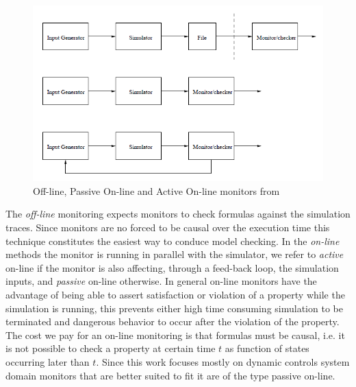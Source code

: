 \begin{figure}[!h]
	\centering 
     \includegraphics[width=.8\textwidth]{Figs/monitortypes.png} 
     \caption{Off-line, Passive On-line and Active On-line monitors from \citep{maler2008checking}} 
     \label{fig:monitortypes} 
\end{figure} 
The \textit{off-line} monitoring expects monitors to check formulas against the simulation traces. Since monitors are no forced to be causal over the execution time this technique constitutes the easiest way to conduce model checking. In the \textit{on-line} methods the monitor is running in parallel with the simulator, we refer to \textit{active} on-line if the monitor is also affecting, through a feed-back loop, the simulation inputs, and \textit{passive} on-line otherwise. In general on-line monitors have the advantage of being able to assert satisfaction or violation of a property while the simulation is running, this prevents either high time consuming simulation to be terminated and dangerous behavior to occur after the violation of the property. The cost we pay for an on-line monitoring is that formulas must be causal, i.e. it is not possible to check a property at certain time $t$ as function of states occurring later than $t$. Since this work focuses mostly on dynamic controls system domain monitors that are better suited to fit it are of the type passive on-line. 

